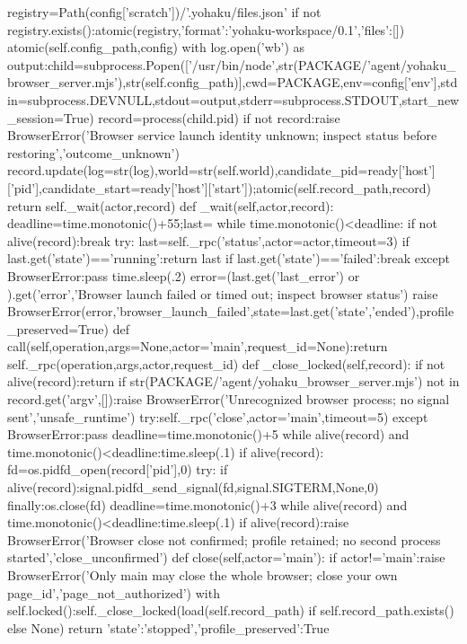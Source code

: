    registry=Path(config['scratch'])/'.yohaku/files.json'
   if not registry.exists():atomic(registry,{'format':'yohaku-workspace/0.1','files':[]})
   atomic(self.config_path,config)
   with log.open('wb') as output:child=subprocess.Popen(['/usr/bin/node',str(PACKAGE/'agent/yohaku_browser_server.mjs'),str(self.config_path)],cwd=PACKAGE,env=config['env'],stdin=subprocess.DEVNULL,stdout=output,stderr=subprocess.STDOUT,start_new_session=True)
   record=process(child.pid)
   if not record:raise BrowserError('Browser service launch identity unknown; inspect status before restoring','outcome_unknown')
   record.update(log=str(log),world=str(self.world),candidate_pid=ready['host']['pid'],candidate_start=ready['host']['start']);atomic(self.record_path,record)
   return self._wait(actor,record)
 def _wait(self,actor,record):
  deadline=time.monotonic()+55;last={}
  while time.monotonic()<deadline:
   if not alive(record):break
   try:
    last=self._rpc('status',actor=actor,timeout=3)
    if last.get('state')=='running':return last
    if last.get('state')=='failed':break
   except BrowserError:pass
   time.sleep(.2)
  error=(last.get('last_error') or {}).get('error','Browser launch failed or timed out; inspect browser status')
  raise BrowserError(error,'browser_launch_failed',state=last.get('state','ended'),profile_preserved=True)
 def call(self,operation,args=None,actor='main',request_id=None):return self._rpc(operation,args,actor,request_id)
 def _close_locked(self,record):
  if not alive(record):return
  if str(PACKAGE/'agent/yohaku_browser_server.mjs') not in record.get('argv',[]):raise BrowserError('Unrecognized browser process; no signal sent','unsafe_runtime')
  try:self._rpc('close',actor='main',timeout=5)
  except BrowserError:pass
  deadline=time.monotonic()+5
  while alive(record) and time.monotonic()<deadline:time.sleep(.1)
  if alive(record):
   fd=os.pidfd_open(record['pid'],0)
   try:
    if alive(record):signal.pidfd_send_signal(fd,signal.SIGTERM,None,0)
   finally:os.close(fd)
   deadline=time.monotonic()+3
   while alive(record) and time.monotonic()<deadline:time.sleep(.1)
  if alive(record):raise BrowserError('Browser close not confirmed; profile retained; no second process started','close_unconfirmed')
 def close(self,actor='main'):
  if actor!='main':raise BrowserError('Only main may close the whole browser; close your own page_id','page_not_authorized')
  with self.locked():self._close_locked(load(self.record_path) if self.record_path.exists() else None)
  return {'state':'stopped','profile_preserved':True}

